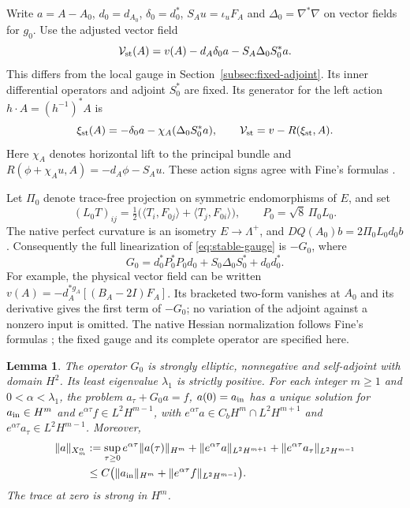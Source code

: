 \documentclass[11pt]{article}
\numberwithin{equation}{section}
\newtheorem{lemma}[theorem]{Lemma}
\theoremstyle{definition}
\theoremstyle{remark}
\begin{document}
Write $a=A-A_0$, $d_0=d_{A_0}$, $\delta_0=d_0^*$,
$S_Au=\iota_uF_A$ and $\Delta_0=\nabla^*\nabla$ on vector
fields for $g_0$. Use the adjusted vector field
\begin{equation}\label{eq:stable-gauge}
 \mathcal V_{\rm st}(A)
 =v(A)-d_A\delta_0a-S_A\Delta_0S_0^*a .
\end{equation}
This differs from the local gauge in
Section~\ref{subsec:fixed-adjoint}. Its inner differential
operators and adjoint $S_0^*$ are fixed. Its generator for the
left action $h\cdot A=(h^{-1})^*A$ is
\[
 \xi_{\rm st}(A)=-\delta_0a-\chi_A(\Delta_0S_0^*a),
 \qquad \mathcal V_{\rm st}=v-R(\xi_{\rm st},A).
\]
Here $\chi_A$ denotes horizontal lift to the principal bundle
and $R(\phi+\chi_Au,A)=-d_A\phi-S_Au$.
These action signs agree with Fine's formulas
\cite[Lemmas 3.2 and 4.4]{Fine2011}.

Let $\Pi_0$ denote trace-free projection on symmetric
endomorphisms of $E$, and set
\[
 (L_0T)_{ij}=\tfrac12
       \bigl(\langle T_i,F_{0j}\rangle+\langle T_j,F_{0i}\rangle\bigr),
 \qquad P_0=\sqrt8\,\Pi_0L_0 .
\]
The native perfect curvature is an isometry
$E\longrightarrow\Lambda^+$, and $DQ(A_0)b=2\Pi_0L_0d_0b$.
Consequently the full linearization of
\eqref{eq:stable-gauge} is $-G_0$, where
\begin{equation}\label{eq:round-positive-operator}
 G_0=d_0^*P_0^*P_0d_0+S_0\Delta_0S_0^*+d_0d_0^* .
\end{equation}
For example, the physical vector field can be written
$v(A)=-d_A^{*g_A}[(B_A-2I)F_A]$. Its bracketed two-form vanishes at
$A_0$ and its derivative gives the first term of $-G_0$;
no variation of the adjoint against a nonzero input is omitted.
The native Hessian normalization follows Fine's formulas
\cite[(3.1)--(3.3), (4.5), (4.7), Proposition 4.12]{Fine2011};
the fixed gauge and its complete operator are specified here.

\begin{lemma}\label{lem:round-positive}
The operator $G_0$ is strongly elliptic, nonnegative and
self-adjoint with domain $H^2$. Its least eigenvalue
$\lambda_1$ is strictly positive. For each integer $m\ge1$ and
$0<\alpha<\lambda_1$, the problem
$a_\tau+G_0a=f$, $a(0)=a_{\rm in}$ has a unique solution
for $a_{\rm in}\in H^m$ and $e^{\alpha\tau}f\in L^2H^{m-1}$,
with $e^{\alpha\tau}a\in C_bH^m\cap L^2H^{m+1}$ and
$e^{\alpha\tau}a_\tau\in L^2H^{m-1}$. Moreover,
\begin{align}
 \|a\|_{X_m^\alpha}
 &:=
 \sup_{\tau\ge0}e^{\alpha\tau}\|a(\tau)\|_{H^m}
 +\|e^{\alpha\tau}a\|_{L^2H^{m+1}}
 +\|e^{\alpha\tau}a_\tau\|_{L^2H^{m-1}}
 \notag\\
 &\le C\bigl(\|a_{\rm in}\|_{H^m}
          +\|e^{\alpha\tau}f\|_{L^2H^{m-1}}\bigr).
 \label{eq:round-weighted-linear}
\end{align}
The trace at zero is strong in $H^m$.
\end{lemma}
\end{document}
